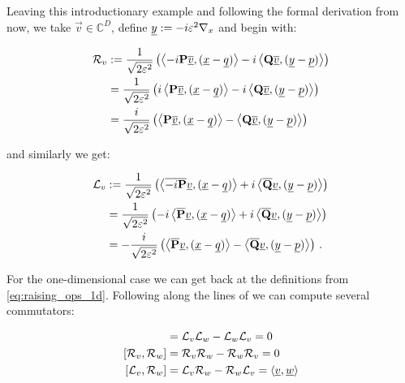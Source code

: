 Leaving this introductionary example and following the formal derivation from
\cite{H_ladder_operators} now, we take $\vec{v} \in \mathbb{C}^D$, define
$\underline{y} := -i \varepsilon^2 \nabla_x$ and begin with:

\begin{align}
  \mathcal{R}_v & := \frac{1}{\sqrt{2\varepsilon^2}}
                  \left(
                    \left\langle -i\mathbf{P}\underline{\overline{v}} , (\underline{x}-\underline{q}) \right\rangle
                    -i \left\langle \mathbf{Q}\underline{\overline{v}} , (\underline{y}-\underline{p}) \right\rangle
                  \right) \\
                & = \frac{1}{\sqrt{2\varepsilon^2}}
                  \left(
                    i \left\langle \mathbf{P}\underline{\overline{v}} , (\underline{x}-\underline{q}) \right\rangle
                    -i \left\langle \mathbf{Q}\underline{\overline{v}} , (\underline{y}-\underline{p}) \right\rangle
                  \right) \\
                & = \frac{i}{\sqrt{2\varepsilon^2}}
                  \left(
                    \left\langle \mathbf{P}\underline{\overline{v}} , (\underline{x}-\underline{q}) \right\rangle
                    - \left\langle \mathbf{Q}\underline{\overline{v}} , (\underline{y}-\underline{p}) \right\rangle
                  \right)
\end{align}

and similarly we get:

\begin{align}
  \mathcal{L}_v & := \frac{1}{\sqrt{2\varepsilon^2}}
                  \left(
                    \left\langle \overline{-i \mathbf{P}}\underline{v} , (\underline{x}-\underline{q}) \right\rangle
                    +i \left\langle \mathbf{\overline{Q}}\underline{v} , (\underline{y}-\underline{p}) \right\rangle
                  \right) \\
                & = \frac{1}{\sqrt{2\varepsilon^2}}
                  \left(
                    -i \left\langle \mathbf{\overline{P}}\underline{v} , (\underline{x}-\underline{q}) \right\rangle
                    +i \left\langle \mathbf{\overline{Q}}\underline{v} , (\underline{y}-\underline{p}) \right\rangle
                  \right) \\
                & = -\frac{i}{\sqrt{2\varepsilon^2}}
                  \left(
                    \left\langle \mathbf{\overline{P}}\underline{v} , (\underline{x}-\underline{q}) \right\rangle
                    - \left\langle \mathbf{\overline{Q}}\underline{v} , (\underline{y}-\underline{p}) \right\rangle
                  \right) \,.
\end{align}

For the one-dimensional case we can get back at the definitions from \eqref{eq:raising_ops_1d}.
Following along the lines of \cite{H_ladder_operators} we can compute several commutators:

\begin{align}
  [\mathcal{L}_v, \mathcal{L}_w] & = \mathcal{L}_v\mathcal{L}_w - \mathcal{L}_w\mathcal{L}_v = 0 \\
  [\mathcal{R}_v, \mathcal{R}_w] & = \mathcal{R}_v\mathcal{R}_w - \mathcal{R}_w\mathcal{R}_v = 0 \\
  [\mathcal{L}_v, \mathcal{R}_w] & = \mathcal{L}_v\mathcal{R}_w - \mathcal{R}_w\mathcal{L}_v = \dotp{\vec{v}}{\vec{w}}
\end{align}

